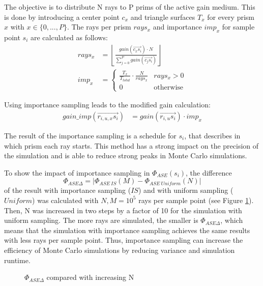 The objective is to distribute N rays to P prims of the active gain medium.
This is done by introducing a center point $c_x$ and triangle surfaces $T_x$ for every prism $x$ with $x \in \{0,...,P\}$.
The rays per prism $rays_x$ and importance $imp_x$ for sample point $s_i$ are calculated as follows:
\begin{align}
  rays_x       &= \left\lfloor\frac{gain(\overrightarrow{c_xs_i}) \cdot N}{\sum^{P}_{j=0} gain(\overrightarrow{c_js_i})}\right\rfloor\\
imp_x &= 
\begin{cases}
\frac{T_x}{T_{total}} \cdot \frac{N}{rays_x} &rays_x > 0\\
0 &\text{otherwise}
\end{cases}
\end{align}

Using importance sampling leads to the modified gain calculation:
\begin{align}
  gain\_imp(\overrightarrow{r_{i,u,x}s_i})        &= gain(\overrightarrow{r_{i,u}s_i}) \cdot imp_x
\end{align}


The result of the importance sampling is a schedule for $s_i$, that
describes in which prism each ray starts.
This method has a strong impact on the precision of the simulation
and is able to reduce strong peaks in Monte Carlo simulations.

To show the impact of importance sampling in $\Phi_{ASE}(s_i)$, the difference
\[\Phi_{ASE\Delta} = |\Phi_{ASE~IS}(M) - \Phi_{ASE~Uniform}(N)|\] of the 
result with importance sampling ($IS$) and with uniform sampling ($Uniform$) was calculated with 
$N,M = 10^5$ rays per sample point (see Figure \ref{graphic:importance}). 
Then, N was increased in two steps by a factor of 10 for the simulation with uniform sampling.
The more rays are simulated, the smaller is $\Phi_{ASE\Delta}$, which 
means that the simulation
with importance sampling achieves the same results with less
rays per sample point. Thus, importance sampling can increase the
efficiency of Monte Carlo simulations by reducing variance 
and simulation runtime. 
\begin{figure}[H]
  \centerline
  {}
  \caption{$\Phi_{ASE\Delta}$ compared with increasing N}
  \label{graphic:importance}
\end{figure}

